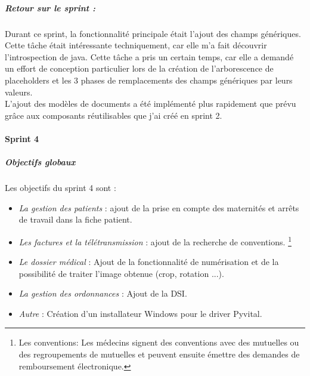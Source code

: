 \subparagraph{Retour sur le sprint :}
Durant ce sprint, la fonctionnalité principale était l'ajout des champs génériques. Cette tâche était intéressante techniquement, car elle m'a fait découvrir l'introspection de java. Cette tâche a pris un certain temps, car elle a demandé un effort de conception particulier lors de la création de l'arborescence de placeholders et les 3 phases de remplacements des champs génériques par leurs valeurs.  \\
L'ajout des modèles de documents a été implémenté plus rapidement que prévu grâce aux composants réutilisables que j'ai créé en sprint 2.\\


\newpage
\paragraph*{Sprint 4}
\subparagraph{Objectifs globaux}

Les objectifs du sprint 4 sont : 
\begin{itemize}
\item \textit{La gestion des patients} : ajout  de la prise en compte des maternités et arrêts de travail dans la fiche patient.

\item \textit{Les factures et la télétransmission} : ajout de la recherche de conventions. \footnote{Les conventions: Les médecins signent des conventions avec des mutuelles ou des regroupements de mutuelles et peuvent ensuite émettre des demandes de remboursement électronique.} 

\item \textit{Le dossier médical} : Ajout de la fonctionnalité de numérisation et de la possibilité de traiter l'image obtenue (crop, rotation ...).

\item \textit{La gestion des ordonnances} : Ajout de la \gls{DSI}.

\item \textit{Autre} : Création d'un installateur Windows pour le driver Pyvital. 
\end{itemize} 

